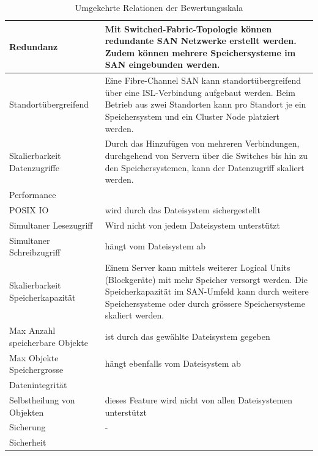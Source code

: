 \begin{table}[htbp]
\caption{Umgekehrte Relationen der Bewertungsskala}
\begin{tabular}{|L{3.5cm}|L{10cm}|}
\hline
Redundanz & Mit Switched-Fabric-Topologie können redundante SAN Netzwerke erstellt werden. Zudem können mehrere Speichersysteme im SAN eingebunden werden. \\ \hline
Standortübergreifend & Eine Fibre-Channel SAN kann standortübergreifend über eine ISL-Verbindung aufgebaut werden. Beim Betrieb aus zwei Standorten kann pro Standort je ein Speichersystem und ein Cluster Node platziert werden. \\ \hline
Skalierbarkeit Datenzugriffe & Durch das Hinzufügen von mehreren Verbindungen, durchgehend von Servern über die Switches bis hin zu den Speichersystemen, kann der Datenzugriff skaliert werden. \\ \hline
Performance &  \\ \hline
POSIX IO & wird durch das Dateisystem sichergestellt \\ \hline
Simultaner Lesezugriff & Wird nicht von jedem Dateisystem unterstützt \\ \hline
Simultaner Schreibzugriff & hängt vom Dateisystem ab \\ \hline
Skalierbarkeit Speicherkapazität & Einem Server kann mittels weiterer Logical Units (Blockgeräte) mit mehr Speicher versorgt werden. Die Speicherkapazität im SAN-Umfeld kann durch weitere Speichersysteme oder durch grössere Speichersysteme skaliert werden. \\ \hline
Max Anzahl speicherbare Objekte & ist durch das gewählte Dateisystem gegeben \\ \hline
Max Objekte Speichergrosse & hängt ebenfalls vom Dateisystem ab \\ \hline
Datenintegrität &  \\ \hline
Selbstheilung von Objekten & dieses Feature wird nicht von allen Dateisystemen unterstützt \\ \hline
Sicherung & - \\ \hline
Sicherheit &  \\ \hline
\end{tabular}
\label{UmgekehrteBewertungsskala}
\end{table}

